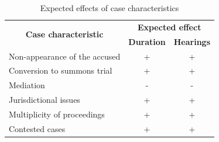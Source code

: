 \begin{longtable}{@{}lcc@{}}
\caption{Expected effects of case characteristics}
\label{tab:expected}\\
\toprule
\multicolumn{1}{c}{\multirow{2}{*}{\textbf{Case characteristic}}} & \multicolumn{2}{c}{\textbf{Expected effect}} \\ \cmidrule(l){2-3} 
\multicolumn{1}{c}{} & \textbf{Duration} & \textbf{Hearings} \\ \midrule
Non-appearance of the accused & + & + \\
Conversion to summons trial & + & + \\
Mediation & - & - \\
Jurisdictional issues & + & + \\
Multiplicity of proceedings & + & + \\
Contested cases & + & + \\ \bottomrule
\end{longtable}

